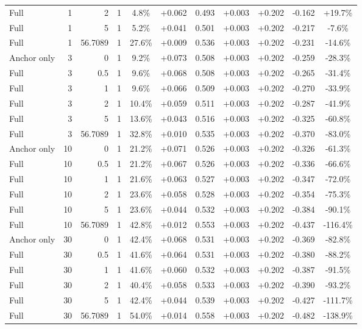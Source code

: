 \begin{table}[htbp]
\begin{tabular}{lrrrccccccc}
Full & 1 & 2 & 1 & 4.8\% & +0.062 & 0.493 & +0.003 & +0.202 & -0.162 & +19.7\% \\
Full & 1 & 5 & 1 & 5.2\% & +0.041 & 0.501 & +0.003 & +0.202 & -0.217 & -7.6\% \\
Full & 1 & 56.7089 & 1 & 27.6\% & +0.009 & 0.536 & +0.003 & +0.202 & -0.231 & -14.6\% \\
Anchor only & 3 & 0 & 1 & 9.2\% & +0.073 & 0.508 & +0.003 & +0.202 & -0.259 & -28.3\% \\
Full & 3 & 0.5 & 1 & 9.6\% & +0.068 & 0.508 & +0.003 & +0.202 & -0.265 & -31.4\% \\
Full & 3 & 1 & 1 & 9.6\% & +0.066 & 0.509 & +0.003 & +0.202 & -0.270 & -33.9\% \\
Full & 3 & 2 & 1 & 10.4\% & +0.059 & 0.511 & +0.003 & +0.202 & -0.287 & -41.9\% \\
Full & 3 & 5 & 1 & 13.6\% & +0.043 & 0.516 & +0.003 & +0.202 & -0.325 & -60.8\% \\
Full & 3 & 56.7089 & 1 & 32.8\% & +0.010 & 0.535 & +0.003 & +0.202 & -0.370 & -83.0\% \\
Anchor only & 10 & 0 & 1 & 21.2\% & +0.071 & 0.526 & +0.003 & +0.202 & -0.326 & -61.3\% \\
Full & 10 & 0.5 & 1 & 21.2\% & +0.067 & 0.526 & +0.003 & +0.202 & -0.336 & -66.6\% \\
Full & 10 & 1 & 1 & 21.6\% & +0.063 & 0.527 & +0.003 & +0.202 & -0.347 & -72.0\% \\
Full & 10 & 2 & 1 & 23.6\% & +0.058 & 0.528 & +0.003 & +0.202 & -0.354 & -75.3\% \\
Full & 10 & 5 & 1 & 23.6\% & +0.044 & 0.532 & +0.003 & +0.202 & -0.384 & -90.1\% \\
Full & 10 & 56.7089 & 1 & 42.8\% & +0.012 & 0.553 & +0.003 & +0.202 & -0.437 & -116.4\% \\
Anchor only & 30 & 0 & 1 & 42.4\% & +0.068 & 0.531 & +0.003 & +0.202 & -0.369 & -82.8\% \\
Full & 30 & 0.5 & 1 & 41.6\% & +0.064 & 0.531 & +0.003 & +0.202 & -0.380 & -88.2\% \\
Full & 30 & 1 & 1 & 41.6\% & +0.060 & 0.532 & +0.003 & +0.202 & -0.387 & -91.5\% \\
Full & 30 & 2 & 1 & 40.4\% & +0.058 & 0.533 & +0.003 & +0.202 & -0.390 & -93.2\% \\
Full & 30 & 5 & 1 & 42.4\% & +0.044 & 0.539 & +0.003 & +0.202 & -0.427 & -111.7\% \\
Full & 30 & 56.7089 & 1 & 54.0\% & +0.014 & 0.558 & +0.003 & +0.202 & -0.482 & -138.9\% \\

\end{tabular}
\end{table}

